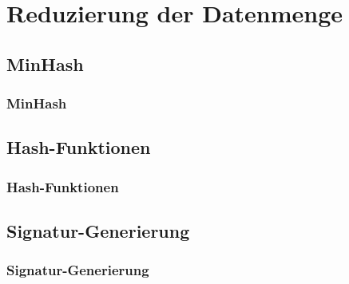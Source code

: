 \section{Reduzierung der Datenmenge}

\subsection{MinHash}

\begin{frame}
    \frametitle{MinHash}
\end{frame}

\subsection{Hash-Funktionen}

\begin{frame}
    \frametitle{Hash-Funktionen}
\end{frame}

\subsection{Signatur-Generierung}

\begin{frame}
    \frametitle{Signatur-Generierung}
\end{frame}